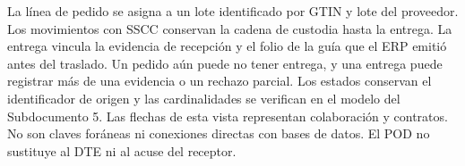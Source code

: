 La línea de pedido se asigna a un lote identificado por GTIN y lote del proveedor. Los movimientos con SSCC conservan la cadena de custodia hasta la entrega. La entrega vincula la evidencia de recepción y el folio de la guía que el ERP emitió antes del traslado. Un pedido aún puede no tener entrega, y una entrega puede registrar más de una evidencia o un rechazo parcial. Los estados conservan el identificador de origen y las cardinalidades se verifican en el modelo del Subdocumento 5. Las flechas de esta vista representan colaboración y contratos. No son claves foráneas ni conexiones directas con bases de datos. El POD no sustituye al DTE ni al acuse del receptor.

\label{fuente-06-modelo-de-datos-conceptual-fin}
